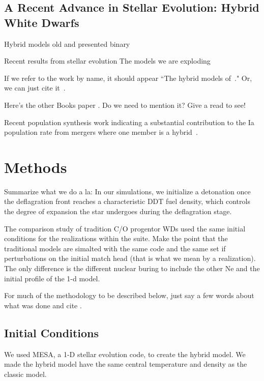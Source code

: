\documentclass[iop,apj]{emulateapj}
\begin{document}
\subsection{A Recent Advance in Stellar Evolution: Hybrid White Dwarfs}

Hybrid models 
old 
\citep{denissenkovetal2015}
\citet{Wangetal2014} and \citet{Mengetal2014} presented binary

Recent results from stellar evolution
The models we are exploding \citep{brooksetal2017}

If we refer to the work by name, it should appear ``The hybrid models
of~\citet{brooksetal2017}." Or, we can just cite it~\citep{brooksetal2017}.

Here's the other Books paper \citep{brooksetal2016}. Do we need to mention it?
Give a read to see!


Recent population synthesis work indicating a substantial contribution
to the Ia population rate from mergers where one member is a 
hybrid~\citep{yungelsonkuranov2017}.

\section{Methods}

Summarize what we do a la:
In our simulations, we initialize a detonation once the 
deflagration front reaches a
characteristic DDT fuel density, which controls the degree of
expansion the star undergoes during the deflagration stage.

The comparison study of tradition C/O progentor WDs used the same
initial conditions for the realizations within the suite. Make the
point that the traditional models are simalted with the same code
and the same set if perturbations on the initial match head (that is
what we mean by a realization). The only difference is the different
nuclear buring to include the other Ne and the initial profile of
the 1-d model.  

For much of the methodology to be described below, just say a few
words about what was done and cite \citet{willcoxetal2016}.

\subsection{Initial Conditions}

We used MESA, a 1-D stellar evolution code, to create the hybrid
model. We made the hybrid model have the same central temperature
and density as the classic model.
\end{document}
